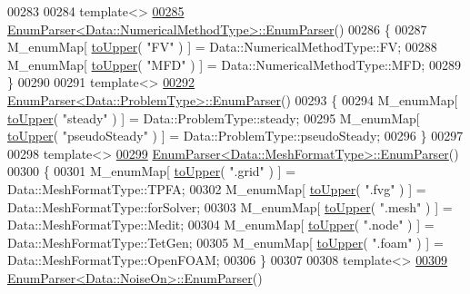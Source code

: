 \begin{DoxyCode}
00283 
00284 \textcolor{keyword}{template}<>
\hypertarget{Data_8cpp_source.tex_l00285}{}\hyperlink{classFVCode3D_1_1EnumParser_a8d2b6c876bec705fcc4e063760e186dd}{00285} \hyperlink{classFVCode3D_1_1EnumParser_a9aea725005dd5c0a0f69be19af1a4de0}{EnumParser<Data::NumericalMethodType>::EnumParser}()
00286 \{
00287     M\_enumMap[ \hyperlink{namespaceFVCode3D_aab0ceb729c2ff3e7fd288097aee76a59}{toUpper}( \textcolor{stringliteral}{"FV"} ) ] = Data::NumericalMethodType::FV;
00288     M\_enumMap[ \hyperlink{namespaceFVCode3D_aab0ceb729c2ff3e7fd288097aee76a59}{toUpper}( \textcolor{stringliteral}{"MFD"} ) ] = Data::NumericalMethodType::MFD;
00289 \}
00290 
00291 \textcolor{keyword}{template}<>
\hypertarget{Data_8cpp_source.tex_l00292}{}\hyperlink{classFVCode3D_1_1EnumParser_a1f83e7583927bff1f4c217386240b2a1}{00292} \hyperlink{classFVCode3D_1_1EnumParser_a9aea725005dd5c0a0f69be19af1a4de0}{EnumParser<Data::ProblemType>::EnumParser}()
00293 \{
00294     M\_enumMap[ \hyperlink{namespaceFVCode3D_aab0ceb729c2ff3e7fd288097aee76a59}{toUpper}( \textcolor{stringliteral}{"steady"} ) ] = Data::ProblemType::steady;
00295     M\_enumMap[ \hyperlink{namespaceFVCode3D_aab0ceb729c2ff3e7fd288097aee76a59}{toUpper}( \textcolor{stringliteral}{"pseudoSteady"} ) ] = Data::ProblemType::pseudoSteady;
00296 \}
00297 
00298 \textcolor{keyword}{template}<>
\hypertarget{Data_8cpp_source.tex_l00299}{}\hyperlink{classFVCode3D_1_1EnumParser_a2fa5564d3682f4ce83ac27e621f4a4e7}{00299} \hyperlink{classFVCode3D_1_1EnumParser_a9aea725005dd5c0a0f69be19af1a4de0}{EnumParser<Data::MeshFormatType>::EnumParser}()
00300 \{
00301     M\_enumMap[ \hyperlink{namespaceFVCode3D_aab0ceb729c2ff3e7fd288097aee76a59}{toUpper}( \textcolor{stringliteral}{".grid"} ) ] = Data::MeshFormatType::TPFA;
00302     M\_enumMap[ \hyperlink{namespaceFVCode3D_aab0ceb729c2ff3e7fd288097aee76a59}{toUpper}( \textcolor{stringliteral}{".fvg"} ) ] = Data::MeshFormatType::forSolver;
00303     M\_enumMap[ \hyperlink{namespaceFVCode3D_aab0ceb729c2ff3e7fd288097aee76a59}{toUpper}( \textcolor{stringliteral}{".mesh"} ) ] = Data::MeshFormatType::Medit;
00304     M\_enumMap[ \hyperlink{namespaceFVCode3D_aab0ceb729c2ff3e7fd288097aee76a59}{toUpper}( \textcolor{stringliteral}{".node"} ) ] = Data::MeshFormatType::TetGen;
00305     M\_enumMap[ \hyperlink{namespaceFVCode3D_aab0ceb729c2ff3e7fd288097aee76a59}{toUpper}( \textcolor{stringliteral}{".foam"} ) ] = Data::MeshFormatType::OpenFOAM;
00306 \}
00307 
00308 \textcolor{keyword}{template}<>
\hypertarget{Data_8cpp_source.tex_l00309}{}\hyperlink{classFVCode3D_1_1EnumParser_a15323dff273a1eeaec2fcafd71e349f4}{00309} \hyperlink{classFVCode3D_1_1EnumParser_a9aea725005dd5c0a0f69be19af1a4de0}{EnumParser<Data::NoiseOn>::EnumParser}()

\end{DoxyCode}
